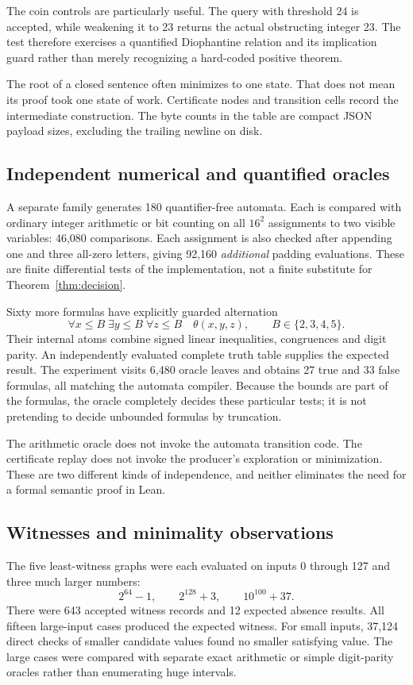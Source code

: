 The coin controls are particularly useful. The query with threshold 24 is accepted, while weakening it to 23 returns the actual obstructing integer 23. The test therefore exercises a quantified Diophantine relation and its implication guard rather than merely recognizing a hard-coded positive theorem.

The root of a closed sentence often minimizes to one state. That does not mean its proof took one state of work. Certificate nodes and transition cells record the intermediate construction. The byte counts in the table are compact JSON payload sizes, excluding the trailing newline on disk.

\subsection{Independent numerical and quantified oracles}
A separate family generates 180 quantifier-free automata. Each is compared with ordinary integer arithmetic or bit counting on all \(16^2\) assignments to two visible variables: 46,080 comparisons. Each assignment is also checked after appending one and three all-zero letters, giving 92,160 \emph{additional} padding evaluations. These are finite differential tests of the implementation, not a finite substitute for Theorem~\ref{thm:decision}.

Sixty more formulas have explicitly guarded alternation
\[
 \forall x\le B\;\exists y\le B\;\forall z\le B\quad\theta(x,y,z),
 \qquad B\in\{2,3,4,5\}.
\]
Their internal atoms combine signed linear inequalities, congruences and digit parity. An independently evaluated complete truth table supplies the expected result. The experiment visits 6,480 oracle leaves and obtains 27 true and 33 false formulas, all matching the automata compiler. Because the bounds are part of the formulas, the oracle completely decides these particular tests; it is not pretending to decide unbounded formulas by truncation.

The arithmetic oracle does not invoke the automata transition code. The certificate replay does not invoke the producer's exploration or minimization. These are two different kinds of independence, and neither eliminates the need for a formal semantic proof in Lean.

\subsection{Witnesses and minimality observations}
The five least-witness graphs were each evaluated on inputs 0 through 127 and three much larger numbers:
\[
 2^{64}-1,\qquad 2^{128}+3,\qquad 10^{100}+37.
\]
There were 643 accepted witness records and 12 expected absence results. All fifteen large-input cases produced the expected witness. For small inputs, 37,124 direct checks of smaller candidate values found no smaller satisfying value. The large cases were compared with separate exact arithmetic or simple digit-parity oracles rather than enumerating huge intervals.

